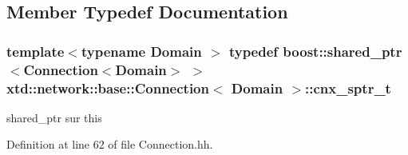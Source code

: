\subsection{Member Typedef Documentation}
\hypertarget{classxtd_1_1network_1_1base_1_1Connection_a10f05cd689d67b012768c79486c6df47}{
\subsubsection[{cnx\-\_\-sptr\-\_\-t}]{\setlength{\rightskip}{0pt plus 5cm}template$<$typename Domain $>$ typedef boost\-::shared\-\_\-ptr$<${\bf Connection}$<$Domain$>$ $>$ {\bf xtd\-::network\-::base\-::\-Connection}$<$ Domain $>$\-::{\bf cnx\-\_\-sptr\-\_\-t}}}\label{classxtd_1_1network_1_1base_1_1Connection_a10f05cd689d67b012768c79486c6df47}


shared\-\_\-ptr sur this 



Definition at line 62 of file Connection.\-hh.



